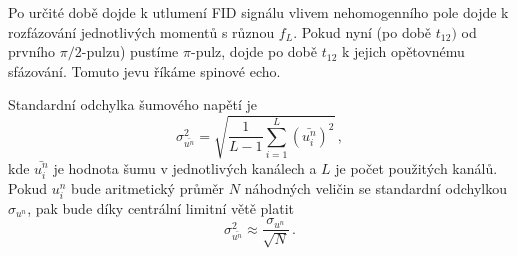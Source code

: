 Po určité době dojde k utlumení FID signálu vlivem nehomogenního pole dojde k rozfázování jednotlivých momentů s různou $f_L$. Pokud nyní (po době $t_{12})$ od prvního $\pi/2$-pulzu) pustíme $\pi$-pulz, dojde po době $t_{12}$ k jejich opětovnému sfázování. Tomuto jevu říkáme spinové echo.

Standardní odchylka šumového napětí je
\begin{equation}
\sigma^2_{\bar{u^n}}=\sqrt{\frac{1}{L-1} \sum_{i=1}^{L} (\bar{u^n_i})^2  } \,,
\end{equation}
kde $\bar{u^n_i}$ je hodnota šumu v jednotlivých kanálech a $L$ je počet použitých kanálů. Pokud $u^n_i $ bude aritmetický průměr $N$ náhodných veličin se standardní odchylkou $\sigma_{u^n}$, pak bude díky centrální limitní větě platit \cite{skripta}
\begin{equation}
\sigma^2_{\bar{u^n}} \approx \frac{\sigma_{u^n}}{\sqrt{N}} \,.
\end{equation}
